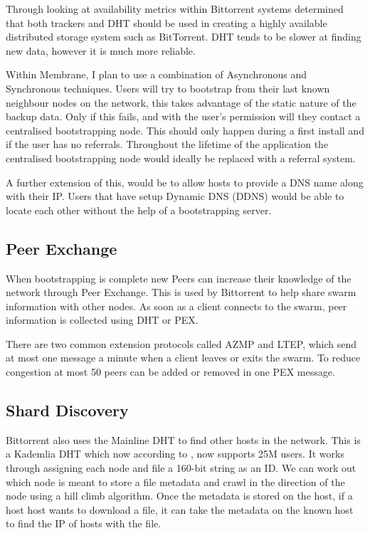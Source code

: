 \documentclass[11pt, a4paper, twocolumn, twoside]{report}
\begin{document}
Through looking at availability metrics within Bittorrent systems \cite{neglia2007availability} determined that both trackers and DHT should be used in creating a highly available distributed storage system such as BitTorrent. DHT tends to be slower at finding new data, however it is much more reliable.

Within Membrane, I plan to use a combination of Asynchronous and Synchronous techniques. Users will try to bootstrap from their last known neighbour nodes on the network, this takes advantage of the static nature of the backup data. Only if this fails, and with the user's permission will they contact a centralised bootstrapping node. This should only happen during a first install and if the user has no referrals. Throughout the lifetime of the application the centralised bootstrapping node would ideally be replaced with a referral system.

A further extension of this, would be to allow hosts to provide a DNS name along with their IP. Users that have setup Dynamic DNS (DDNS) \citep{bound1997dynamic} would be able to locate each other without the help of a bootstrapping server.

\subsection{Peer Exchange}

When bootstrapping is complete new Peers can increase their knowledge of the network through Peer Exchange. This is used by Bittorrent to help share swarm information with other nodes. As soon as a client connects to the swarm, peer information is collected using DHT or PEX.

There are two common extension protocols called AZMP and LTEP, which send at most one message a minute when a client leaves or exits the swarm. To reduce congestion at most 50 peers can be added or removed in one PEX message. \citep{vuze2010vuze}

\subsection{Shard Discovery}

Bittorrent also uses the Mainline DHT to find other hosts in the network. This is a Kademlia DHT which now according to \cite{jones2015mainlinedht}, now supports 25M users. It works through assigning each node and file a 160-bit string as an ID. We can work out which node is meant to store a file metadata and crawl in the direction of the node using a hill climb algorithm. Once the metadata is stored on the host, if a host host wants to download a file, it can take the metadata on the known host to find the IP of hosts with the file.
\end{document}
